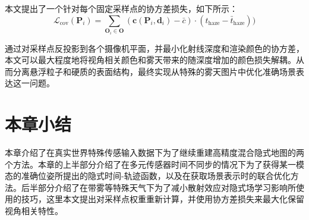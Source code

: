 本文提出了一个针对每个固定采样点的协方差损失，如下所示：
\begin{equation}
    \mathcal L_\text{cov}(\mathbf{P}_i) = \sum_{\mathbf{O}_i \in \mathbf{O}}(\mathbf{c}(\mathbf{P}_i, \mathbf{d}_i)-\bar{c})\cdot ({t}_\text{haze} - {\bar{t}}_\text{haze}))
\end{equation}

通过对采样点反投影到各个摄像机平面，并最小化射线深度和渲染颜色的协方差，本文可以最大程度地将视角相关颜色和雾天带来的随深度增加的颜色损失解耦。从而分离悬浮粒子和硬质的表面结构，最终实现从特殊的雾天图片中优化准确场景表达这一问题。

\section{本章小结}
本章介绍了在真实世界特殊传感输入数据下为了继续重建高精度混合隐式地图的两个方法。本章的上半部分介绍了在多元传感器时间不同步的情况下为了获得某一模态的准确位姿所提出的隐式时间-轨迹函数，以及在获取场景表示时的联合优化方法。后半部分介绍了在带雾等特殊天气下为了减小散射效应对隐式场学习影响所使用的技巧，这里本文提出对采样点权重重新计算，并使用协方差损失来最大化保留视角相关特性。